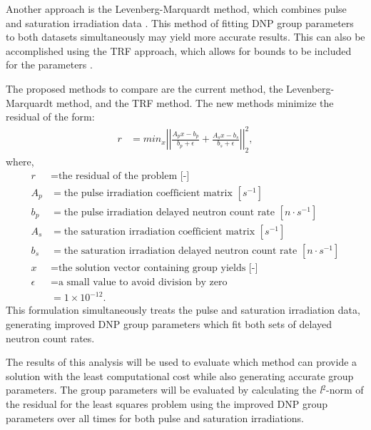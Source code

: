 Another approach is the Levenberg-Marquardt method, which combines pulse and saturation irradiation data \cite{levenberg1944method, marquardt1963algorithm, mills2014calculation}.
This method of fitting \gls{DNP} group parameters to both datasets simultaneously may yield more accurate results.
This can also be accomplished using the \gls{TRF} approach, which allows for bounds to be included for the parameters \cite{branch1999subspace}.

The proposed methods to compare are the current method, the Levenberg-Marquardt method, and the \gls{TRF} method.
The new methods minimize the residual of the form:
\begin{align}
    r &= min_x \left| \left| \frac{A_px - b_p}{b_p + \epsilon} +  \frac{A_sx - b_s}{b_s + \epsilon}  \right| \right|^2_2,
\end{align}
where,
\begin{align}
    r &= \text{the residual of the problem [-]} \nonumber \\
    A_p &= \text{the pulse irradiation coefficient matrix $[s^{-1}]$} \nonumber \\
    b_p &= \text{the pulse irradiation delayed neutron count rate $[n \cdot s^{-1}]$} \nonumber \\
    A_s &= \text{the saturation irradiation coefficient matrix $[s^{-1}]$} \nonumber \\
    b_s &= \text{the saturation irradiation delayed neutron count rate $[n \cdot s^{-1}]$} \nonumber \\
    x &= \text{the solution vector containing group yields [-]} \nonumber \\
    \epsilon &= \text{a small value to avoid division by zero} \nonumber \\
    &= 1\times10^{-12}. \nonumber
\end{align}
This formulation simultaneously treats the pulse and saturation irradiation data, generating improved \gls{DNP} group parameters which fit both sets of delayed neutron count rates.

The results of this analysis will be used to evaluate which method can provide a solution with the least computational cost while also generating accurate group parameters.
The group parameters will be evaluated by calculating the \textit{l}$^2$-norm of the residual for the least squares problem using the improved \gls{DNP} group parameters over all times for both pulse and saturation irradiations.